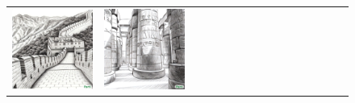 \begin{figure}[ht!]
\begin{adjustwidth}{-0.8in}{-0.5in}
\begin{tabular}{cccccccccccccccccccc}
\multicolumn{3}{c}{\includegraphics[width=\twobytwocolwidth\textwidth]{figures/cherries/charcoal_great_wall.jpg}} &
\multicolumn{3}{c}{\includegraphics[width=\twobytwocolwidth\textwidth]{figures/cherries/charcoal_hypostyle.jpg}} \\

\end{tabular}
\end{adjustwidth}
\end{figure}
